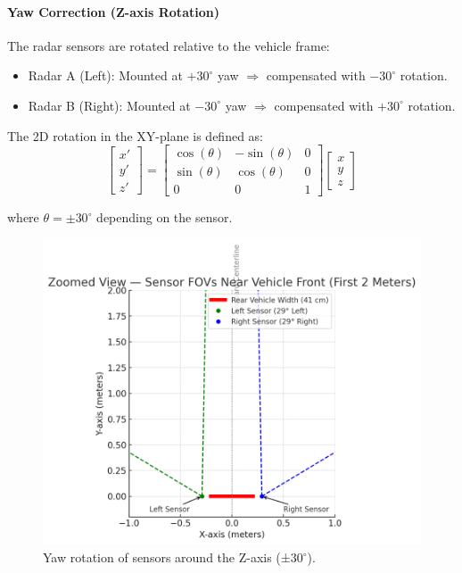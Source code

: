 \paragraph{Yaw Correction (Z-axis Rotation)}
The radar sensors are rotated relative to the vehicle frame:

\begin{itemize}
    \item Radar A (Left): Mounted at $+30^\circ$ yaw $\Rightarrow$ compensated with $-30^\circ$ rotation.
    \item Radar B (Right): Mounted at $-30^\circ$ yaw $\Rightarrow$ compensated with $+30^\circ$ rotation.
\end{itemize}

The 2D rotation in the XY-plane is defined as:
\[
\begin{bmatrix}
x' \\
y' \\
z'
\end{bmatrix}
=
\begin{bmatrix}
\cos(\theta) & -\sin(\theta) & 0 \\
\sin(\theta) & \cos(\theta) & 0 \\
0 & 0 & 1
\end{bmatrix}
\begin{bmatrix}
x \\
y \\
z
\end{bmatrix}
\]

where $\theta = \pm30^\circ$ depending on the sensor.

\begin{figure}[!htbp]
    \centering
    \includegraphics[width=0.8\linewidth]{images/SensorsRotation.png}
    \caption{Yaw rotation of sensors around the Z-axis (±30$^\circ$).}
    \label{fig:z_axis_rotation}
\end{figure}

